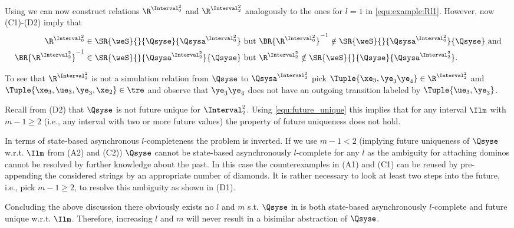 \noindent Using  we can now construct relations $\R^{\Interval^2_0}$ and $\R^{\Interval^2_2}$ analogously to the ones for $l=1$ in \eqref{equ:example:Rl1}. However, now (C1)-(D2) imply that 
\begin{align*}
 \R^{\Interval^2_0}\in\SR{\weS}{}{\Qsyse}{\Qsysa^{\Interval^2_0}}~&\text{but}~
 \BR{\R^{\Interval^2_0}}^{-1}\notin\SR{\weS}{}{\Qsysa^{\Interval^2_0}}{\Qsyse}~\text{and}\\
 \BR{\R^{\Interval^2_2}}^{-1}\in\SR{\weS}{}{\Qsysa^{\Interval^2_2}}{\Qsyse}~&\text{but}~
 \R^{\Interval^2_2}\notin\SR{\weS}{}{\Qsyse}{\Qsysa^{\Interval^2_2}}.
\end{align*}

\noindent To see that $\R^{\Interval^2_2}$ is not a simulation relation from $\Qsyse$ to $\Qsysa^{\Interval^2_2}$ pick $\Tuple{\xe_3,\ye_3\ye_4}\in\R^{\Interval^2_2}$ and $\Tuple{\xe_3,\ue_3,\ye_3,\xe_2}\in\tre$ and observe that $\ye_3\ye_4$ does not have an outgoing transition labeled by $\Tuple{\ue_3,\ye_3}$.

Recall from (D2) that $\Qsyse$ is not future unique for $\Interval^2_2$. Using \eqref{equ:future_unique} this implies that for any interval $\Ilm$ with $m-1\geq 2$ (i.e., any interval with two or more future values) the property of future uniqueness does not hold. 

In terms of state-based asynchronous $l$-completeness the problem is inverted. If we use $m-1<2$ (implying future uniqueness of $\Qsyse$ w.r.t. $\Ilm$ from (A2) and (C2)) $\Qsyse$ cannot be state-based asynchronously $l$-complete for any $l$ as the ambiguity for attaching dominos cannot be resolved by further knowledge about the past. In this case the counterexamples in (A1) and (C1) can be reused by pre-appending the considered strings by an appropriate number of diamonds. It is rather necessary to look at least two steps into the future, i.e., pick $m-1\geq 2$, to resolve this ambiguity as shown in (D1). 

Concluding the above discussion there obviously exists no $l$ and $m$ s.t. $\Qsyse$ in  is both state-based asynchronously $l$-complete and future unique w.r.t. $\Ilm$. Therefore, increasing $l$ and $m$ will never result in a bisimilar abstraction of $\Qsyse$.










